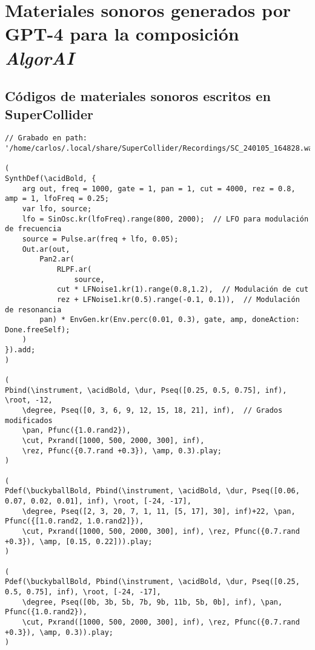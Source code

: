 \chapter{Materiales sonoros generados por GPT-4 para la composición \emph{AlgorAI}}
\label{anexo:algorai}

\section{Códigos de materiales sonoros escritos en SuperCollider}

\begin{minipage}[t]{1\textwidth}
    \centering
    \begin{lstlisting}[style=SuperCollider-IDE, basicstyle=\footnotesize\ttfamily, numbers=none]
// Grabado en path: '/home/carlos/.local/share/SuperCollider/Recordings/SC_240105_164828.wav'

(
SynthDef(\acidBold, {
    arg out, freq = 1000, gate = 1, pan = 1, cut = 4000, rez = 0.8, amp = 1, lfoFreq = 0.25;
    var lfo, source;
    lfo = SinOsc.kr(lfoFreq).range(800, 2000);  // LFO para modulación de frecuencia
    source = Pulse.ar(freq + lfo, 0.05);
    Out.ar(out,
        Pan2.ar(
            RLPF.ar(
                source,
            cut * LFNoise1.kr(1).range(0.8,1.2),  // Modulación de cut
            rez + LFNoise1.kr(0.5).range(-0.1, 0.1)),  // Modulación de resonancia
        pan) * EnvGen.kr(Env.perc(0.01, 0.3), gate, amp, doneAction: Done.freeSelf);
    )
}).add;
)

(
Pbind(\instrument, \acidBold, \dur, Pseq([0.25, 0.5, 0.75], inf), \root, -12,
    \degree, Pseq([0, 3, 6, 9, 12, 15, 18, 21], inf),  // Grados modificados
    \pan, Pfunc({1.0.rand2}),
    \cut, Pxrand([1000, 500, 2000, 300], inf),
    \rez, Pfunc({0.7.rand +0.3}), \amp, 0.3).play;
)

(
Pdef(\buckyballBold, Pbind(\instrument, \acidBold, \dur, Pseq([0.06, 0.07, 0.02, 0.01], inf), \root, [-24, -17],
    \degree, Pseq([2, 3, 20, 7, 1, 11, [5, 17], 30], inf)+22, \pan, Pfunc({[1.0.rand2, 1.0.rand2]}),
    \cut, Pxrand([1000, 500, 2000, 300], inf), \rez, Pfunc({0.7.rand +0.3}), \amp, [0.15, 0.22])).play;
)

(
Pdef(\buckyballBold, Pbind(\instrument, \acidBold, \dur, Pseq([0.25, 0.5, 0.75], inf), \root, [-24, -17],
    \degree, Pseq([0b, 3b, 5b, 7b, 9b, 11b, 5b, 0b], inf), \pan, Pfunc({1.0.rand2}),
    \cut, Pxrand([1000, 500, 2000, 300], inf), \rez, Pfunc({0.7.rand +0.3}), \amp, 0.3)).play;
)


\end{lstlisting}
\end{minipage}

